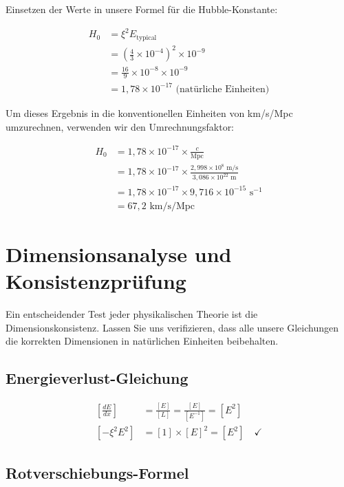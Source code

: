 \documentclass[12pt,a4paper]{article}
\begin{document}
	Einsetzen der Werte in unsere Formel für die Hubble-Konstante:
	
	\begin{align}
		H_0 &= \xi^2 E_{\text{typical}} \\
		&= \left(\frac{4}{3} \times 10^{-4}\right)^2 \times 10^{-9} \\
		&= \frac{16}{9} \times 10^{-8} \times 10^{-9} \\
		&= 1{,}78 \times 10^{-17} \text{ (natürliche Einheiten)}
	\end{align}
	
	Um dieses Ergebnis in die konventionellen Einheiten von km/s/Mpc umzurechnen, verwenden wir den Umrechnungsfaktor:
	
	\begin{align}
		H_0 &= 1{,}78 \times 10^{-17} \times \frac{c}{\text{Mpc}} \\
		&= 1{,}78 \times 10^{-17} \times \frac{2{,}998 \times 10^8 \text{ m/s}}{3{,}086 \times 10^{22} \text{ m}} \\
		&= 1{,}78 \times 10^{-17} \times 9{,}716 \times 10^{-15} \text{ s}^{-1} \\
		&= 67{,}2 \text{ km/s/Mpc}
	\end{align}
	
	\section{Dimensionsanalyse und Konsistenzprüfung}
	
	Ein entscheidender Test jeder physikalischen Theorie ist die Dimensionskonsistenz. Lassen Sie uns verifizieren, dass alle unsere Gleichungen die korrekten Dimensionen in natürlichen Einheiten beibehalten.
	
	\subsection{Energieverlust-Gleichung}
	
	\begin{align}
		\left[\frac{dE}{dx}\right] &= \frac{[E]}{[L]} = \frac{[E]}{[E^{-1}]} = [E^2] \\
		\left[-\xi^2 E^2\right] &= [1] \times [E]^2 = [E^2] \quad \checkmark
	\end{align}
	
	\subsection{Rotverschiebungs-Formel}
	
\end{document}
